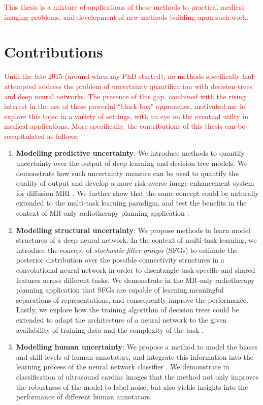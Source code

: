 \textcolor{red}{This thesis is a mixture of applications of these methods to practical medical imaging problems, and development of new methods building upon such work. }


\section{Contributions} 
\textcolor{red}{Until the late 2015 (around when my PhD started), no methods specifically had attempted address the problem of uncertainty quantification with decision trees and deep neural networks. The presence of this gap, combined with the rising interest in the use of these powerful ``black-box" approaches, motivated me to explore this topic in a variety of settings, with an eye on the eventual utilty in medical applications. More specifically, the contributions of this thesis can be recapitulated as follows:}

\begin{enumerate}
	\item \textbf{Modelling predictive uncertainty}:  We introduce methods to quantify uncertainty over the output of deep learning and decision tree models. We demonstrate how such uncertainty measure can be used to quantify the quality of output and develop a more risk-averse image enhancement system for diffusion MRI \cite{tanno2016bayesian,tanno2017bayesian,tannonimg2019}.  We further show that the same concept could be naturally extended to the multi-task learning paradigm, and test the benefits in the context of MR-only radiotherapy planning application \cite{bragman2018multi}. 
	
	\item \textbf{Modelling structural uncertainty}: We propose methods to learn model structures of a deep neural network. In the context of multi-task learning, we introduce the concept of \emph{stochastic filter  groups} (SFGs) \cite{sfg2019} to estimate the posterior distribution over the possible connectivity structures in a convolutional neural network in order to disentangle task-specific and shared features across different tasks. We demonstrate in the MR-only radiotherapy planning application that SFGs are capable of learning meaningful separations of representations, and consequently improve the performance. Lastly, we explore how the training algorithm of decision trees could be extended to adapt the architecture of a neural network to the given availability of training data and the complexity of the task \cite{AdaptiveNeuralTrees19}. 
	
	\item \textbf{Modelling human uncertainty}: We propose a method to model the biases and skill levels of human annotators, and integrate this information into the learning process of the neural network classifier \cite{tanno2019learning}. We demonstrate in classification of ultrasound cardiac images that the method not only improves the robustness of the model to label noise, but also yields insights into the performance of different human annotators.
	
\end{enumerate}

